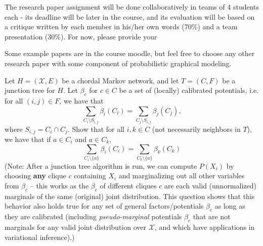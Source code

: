 \documentclass[addpoints,11pt,a4paper]{exam}
\begin{document}
\begin{questions}
\setcounter{question}{-1}

 The research paper assignment will be done collaboratively in teams of 4 students each - its deadline will be later in the course, and its evaluation will be based on a critique written by each member in his/her own words (70\%) and a team presentation (30\%). For now, please provide your 
Some example papers are in the course moodle, but feel free to choose any other research paper with some component of probabilistic graphical modeling.

 Let $H=({\mathcal X}, E)$ be a chordal Markov network, and let $T=(C,F)$ be a junction tree for $H$. Let $\beta_c$ for $c \in C$ be a set of (locally) calibrated potentials, i.e. for all $(i,j) \in F$, we have that 
\[\sum_{C_i \setminus S_{i,j}} \beta_i(C_i) = \sum_{C_j \setminus S_{i,j}} \beta_j(C_j),\]
where $S_{i,j}=C_i\cap C_j$. Show that for all $i,k \in C$ (not necessarily neighbors in $T$), we have that if $a\in C_i$ and $a\in C_k$, 
\[ \sum_{C_i\setminus\{a\}} \beta_i(C_i) = \sum_{C_k\setminus\{a\}} \beta_k(C_k)\]
(Note: After a junction tree algorithm is run, we can compute $P(X_i)$ by choosing {\bf any} clique $c$ containing $X_i$ and marginalizing out all other variables from $\beta_c$ -- this works as the $\beta_c$ of different cliques $c$ are each valid (unnormalized) marginals of the same (original) joint distribution. This question shows that this behavior also holds true for any set of general factors/potentials $\beta_c$ as long as they are calibrated (including {\it pseudo-marginal} potentials $\beta_c$ that are not marginals for any valid joint distribution over $\mathcal{X}$, and which have applications in variational inference).)


\end{questions}
\end{document}
